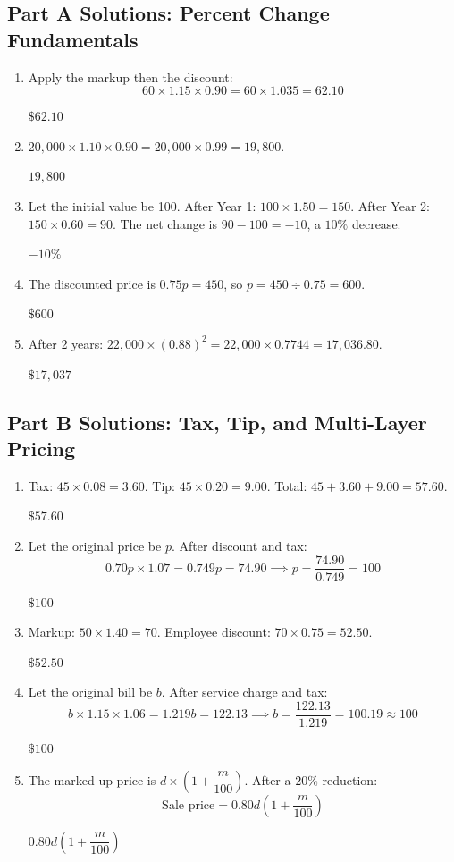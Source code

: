 \documentclass[14pt]{extarticle}
\begin{document}
\subsection*{Part A Solutions: Percent Change Fundamentals}
\begin{enumerate}
  \item Apply the markup then the discount:
  \[
  60 \times 1.15 \times 0.90 = 60 \times 1.035 = 62.10
  \]

  \(\boxed{\$62.10}\)

  \item \(20{,}000 \times 1.10 \times 0.90 = 20{,}000 \times 0.99 = 19{,}800\).

  \(\boxed{19{,}800}\)

  \item Let the initial value be 100. After Year 1: \(100 \times 1.50 = 150\). After Year 2: \(150 \times 0.60 = 90\). The net change is \(90 - 100 = -10\), a \(10\%\) decrease.

  \(\boxed{-10\%}\)

  \item The discounted price is \(0.75p = 450\), so \(p = 450 \div 0.75 = 600\).

  \(\boxed{\$600}\)

  \item After 2 years: \(22{,}000 \times (0.88)^2 = 22{,}000 \times 0.7744 = 17{,}036.80\).

  \(\boxed{\$17{,}037}\)
\end{enumerate}

\subsection*{Part B Solutions: Tax, Tip, and Multi-Layer Pricing}
\begin{enumerate}
  \item Tax: \(45 \times 0.08 = 3.60\). Tip: \(45 \times 0.20 = 9.00\). Total: \(45 + 3.60 + 9.00 = 57.60\).

  \(\boxed{\$57.60}\)

  \item Let the original price be \(p\). After discount and tax:
  \[
  0.70p \times 1.07 = 0.749p = 74.90 \implies p = \frac{74.90}{0.749} = 100
  \]

  \(\boxed{\$100}\)

  \item Markup: \(50 \times 1.40 = 70\). Employee discount: \(70 \times 0.75 = 52.50\).

  \(\boxed{\$52.50}\)

  \item Let the original bill be \(b\). After service charge and tax:
  \[
  b \times 1.15 \times 1.06 = 1.219b = 122.13 \implies b = \frac{122.13}{1.219} = 100.19 \approx 100
  \]

  \(\boxed{\$100}\)

  \item The marked-up price is \(d \times \left(1 + \dfrac{m}{100}\right)\). After a \(20\%\) reduction:
  \[
  \text{Sale price} = 0.80d\left(1 + \frac{m}{100}\right)
  \]

  \(\boxed{0.80d\!\left(1 + \dfrac{m}{100}\right)}\)
\end{enumerate}
\end{document}
